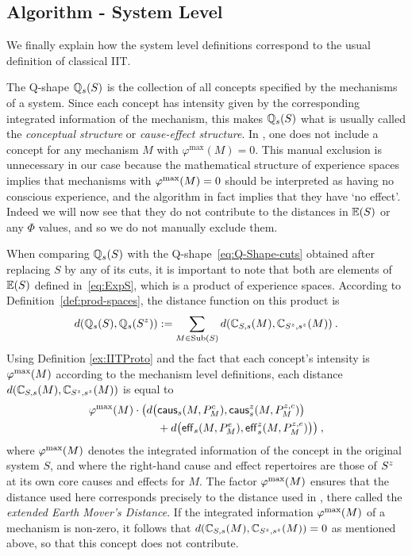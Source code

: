 \subsection{Algorithm - System Level}
We finally explain how the system level definitions correspond to the usual definition of classical IIT.

The Q-shape $\mathbb{Q}_s(S)$ is the collection of all concepts specified by the mechanisms of a system. Since each concept has intensity given by the corresponding integrated information of the mechanism, this makes $\mathbb{Q}_s(S)$ what is usually called the \emph{conceptual structure} or \emph{cause-effect structure}. 
In \cite{oizumi2014phenomenology}, one does not include a concept for any mechanism $M$ with $ \varphi^{\textrm{max}}(M) = 0$. This manual exclusion is unnecessary in our case because the mathematical structure of experience spaces implies that mechanisms with $\varphi^{\textrm{max}}(M) = 0$ should be interpreted as having no conscious experience, and the algorithm in fact implies that they have `no effect'. Indeed we will now see that they do not contribute to the distances in $\mathbb{E}(S)$ or any $\Phi$ values, and so we do not manually exclude them.

When comparing $\mathbb{Q}_s(S)$ with the Q-shape~\eqref{eq:Q-Shape-cuts} obtained after replacing $S$ by any of its cuts, it is important to note that both are elements of $\mathbb{E}(S)$ defined in~\eqref{eq:ExpS}, which is a product of experience spaces. According to Definition~\ref{def:prod-spaces}, the distance function on this product is
\[
d(\mathbb{Q}_s(S),\mathbb{Q}_s({S}^{z}))
:= 
\sum_{M \in \mathrm{Sub}(S)}
d(\mathbb{C}_{S,s}(M),\mathbb{C}_{{S}^{z},{s}^{z}}(M)) \:.
\]
Using Definition \ref{ex:IITProto} and the fact that each concept's intensity is $\varphi^{\textrm{max}}(M)$ according to the mechanism level definitions,
each distance $d(\mathbb{C}_{S,s}(M),\mathbb{C}_{{S}^{z},{s}^{z}}(M))$  is equal to
\begin{align}\begin{split}\label{eq:AppDist}
\varphi^{\textrm{max}}(M) \cdot 
\big(d\big(&\mathsf{caus}_s(M,P^c_M), 
\mathsf{caus}^z_s(M,P^{z,c}_M)\big) \\
&+ 
d\big(\mathsf{eff}_s(M,P^e_M), 
\mathsf{eff}^z_s(M,P^{z,e}_M)\big)
\big) \: ,
\end{split}\end{align}
where $\varphi^{\textrm{max}}(M)$ denotes the integrated information of the concept in the original system $S$, and where the right-hand cause and effect repertoires are those of ${S}^{z}$ at its own core causes and effects for $M$. 
The factor $\varphi^{\textrm{max}}(M)$ ensures that the distance used here corresponds precisely to the distance used in \cite{oizumi2014phenomenology}, there called the \emph{extended Earth Mover's Distance}. If the integrated information $\varphi^{\textrm{max}}(M)$ of a mechanism is non-zero, it follows that $d(\mathbb{C}_{S,s}(M),\mathbb{C}_{{S}^{z},{s}^{z}}(M)) = 0$ as mentioned above, so that this concept does not contribute.

